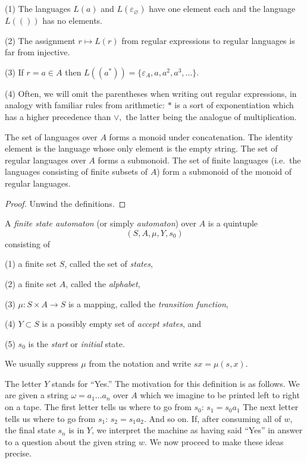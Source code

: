 \begin{rems}
    (1) The languages $L(a)$ and $L(\varepsilon_\varnothing)$ have
    one element each and the language $L( ( ) )$ has no elements.

    (2) The assignment $r\mapsto L(r)$ from regular expressions to
    regular languages is far from injective.

    (3) If $r = a \in A$ then $L( (a^*) ) = \{\varepsilon_A, a, a^2,
    a^3, \dots\}.$

    (4) Often, we will omit the parentheses when writing out regular
    expressions, in analogy with familiar rules from arithmetic: $*$
    is a sort of exponentiation which has a higher precedence than
    $\vee,$ the latter being the analogue of multiplication.
\end{rems}

\begin{prop} The set of languages over $A$ forms a monoid under
    concatenation. The identity element is the language whose only
    element is the empty string. The set of regular languages over $A$
    forms a submonoid. The set of finite languages (i.e.~the languages
    consisting of finite subsets of $A$) form a submonoid of the
    monoid of regular languages.
\end{prop}
\begin{proof} Unwind the definitions.
\end{proof}

\begin{defn} A \emph{finite state automaton} (or simply
    \emph{automaton}) over $A$ is a quintuple $$(S,A,\mu,Y,s_0)$$
    consisting of

    (1) a finite set $S$, called the set of \emph{states},

    (2) a finite set $A$, called the \emph{alphabet},

    (3) $\mu : S\times A \rightarrow S$ is a mapping, called the
    \emph{transition function},

    (4) $Y \subset S$ is a possibly empty set of \emph{accept states}, and

    (5) $s_0$ is the \emph{start} or \emph{initial} state.

    We usually suppress $\mu$ from the notation and write $sx =
    \mu(s,x).$
\end{defn}

\begin{rem} The letter $Y$ stands for ``Yes.'' The motivation for this
    definition is as follows. We are given a string $\omega = a_1\dots
    a_n$ over $A$ which we imagine to be printed left to right on a
    tape. The first letter tells us where to go from $s_0$: $s_1 = s_0
    a_1$ The next letter tells us where to go from $s_1$: $s_2 = s_1
    a_2$. And so on. If, after consuming all of $w$, the final state
    $s_n$ is in $Y$, we interpret the machine as having said ``Yes''
    in answer to a question about the given string $w$. We now proceed
    to make these ideas precise.
\end{rem}

